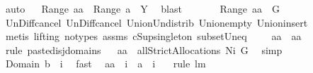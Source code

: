 \begin{isabellebody}
\ auto\isanewline
{}\isamarkupfalse%
\ \isamarkupfalse%
\ {\isachardoublequoteopen}Range\ {\isacharquery}aa\ {\isacharequal}\ Range\ a\ {\isasymunion}\ {\isacharquery}Y{\isachardoublequoteclose}\ \isamarkupfalse%
\ blast\ \isamarkupfalse%
\ \isamarkupfalse%
\ \isamarkupfalse%
\ \isanewline
{\isachardoublequoteopen}{\isasymUnion}\ Range\ {\isacharquery}aa\ {\isacharequal}\ G{\isachardoublequoteclose}\ \isamarkupfalse%
\ Un{\isacharunderscore}Diff{\isacharunderscore}cancel\ Un{\isacharunderscore}Diff{\isacharunderscore}cancel{}\ Union{\isacharunderscore}Un{\isacharunderscore}distrib\ Union{\isacharunderscore}empty\ Union{\isacharunderscore}insert\ \ \isanewline
{}\isamarkupfalse%
\ {\isacharparenleft}metis\ {\isacharparenleft}lifting{\isacharcomma}\ no{\isacharunderscore}types{\isacharparenright}\ assms{\isacharparenleft}{}{\isacharparenright}\ cSup{\isacharunderscore}singleton\ subset{\isacharunderscore}Un{\isacharunderscore}eq{\isacharparenright}\ \isamarkupfalse%
\ \isamarkupfalse%
\ \isanewline
{\isachardoublequoteopen}{\isacharquery}aa{\isacharprime}\ {\isacharequal}\ {\isacharquery}aa{\isachardoublequoteclose}\ \isamarkupfalse%
\ {}\ \isamarkupfalse%
\ {\isacharparenleft}rule\ paste{\isacharunderscore}disj{\isacharunderscore}domains{\isacharparenright}\isanewline
{}\isamarkupfalse%
\ \isamarkupfalse%
\ {\isachardoublequoteopen}{\isacharquery}aa{\isacharprime}\ {\isasymin}\ allStrictAllocations{\isacharprime}{\isacharprime}{\isacharprime}\ {\isacharparenleft}N{\isasymunion}{\isacharbraceleft}{\isacharquery}i{\isacharbraceright}{\isacharparenright}\ G{\isachardoublequoteclose}\ \isamarkupfalse%
\ simp\isanewline
{}\isamarkupfalse%
\ \isamarkupfalse%
\ {\isachardoublequoteopen}Domain\ {\isacharquery}b\ {\isasymsubseteq}\ {\isacharbraceleft}{\isacharquery}i{\isacharbraceright}{\isachardoublequoteclose}\ \isamarkupfalse%
\ fast\ \isanewline
{}\isamarkupfalse%
\ {\isachardoublequoteopen}{\isacharquery}aa{\isacharprime}\ {\isacharminus}{\isacharminus}\ {\isacharquery}i\ {\isacharequal}\ a\ {\isacharminus}{\isacharminus}\ {\isacharquery}i{\isachardoublequoteclose}\ \ \isamarkupfalse%
\ {\isacharparenleft}rule\ lm{}{}{\isacharparenright}\isanewline
{}\isamarkupfalse%

\end{isabellebody}
